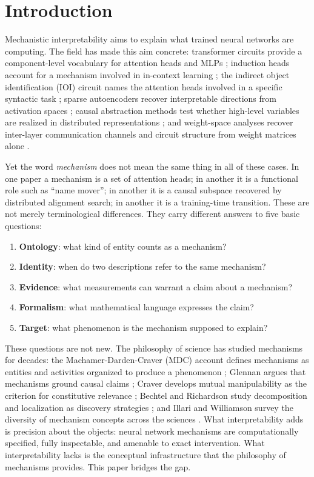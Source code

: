 \documentclass[11pt]{article}
\theoremstyle{remark}
\begin{document}
\section{Introduction}

Mechanistic interpretability aims to explain what trained neural
networks are computing.  The field has made this aim concrete:
transformer circuits provide a component-level vocabulary for attention
heads and MLPs \citep{elhage2021}; induction heads account for a
mechanism involved in in-context learning \citep{olsson2022}; the
indirect object identification (IOI) circuit names the attention heads
involved in a specific syntactic task \citep{wang2022}; sparse
autoencoders recover interpretable directions from activation spaces
\citep{bricken2023,templeton2024}; causal abstraction methods test
whether high-level variables are realized in distributed representations
\citep{geiger2021,geiger2024}; and weight-space analyses recover
inter-layer communication channels and circuit structure from weight
matrices alone \citep{merullo2024,elhage2021}.

Yet the word \emph{mechanism} does not mean the same thing in all of
these cases.  In one paper a mechanism is a set of attention heads;
in another it is a functional role such as ``name mover''; in another
it is a causal subspace recovered by distributed alignment search; in
another it is a training-time transition.  These are not merely
terminological differences.  They carry different answers to five basic
questions:
\begin{enumerate}[leftmargin=*,label=(\arabic*)]
\item \textbf{Ontology}: what kind of entity counts as a mechanism?
\item \textbf{Identity}: when do two descriptions refer to the same mechanism?
\item \textbf{Evidence}: what measurements can warrant a claim about a mechanism?
\item \textbf{Formalism}: what mathematical language expresses the claim?
\item \textbf{Target}: what phenomenon is the mechanism supposed to explain?
\end{enumerate}
These questions are not new.  The philosophy of science has studied
mechanisms for decades: the Machamer-Darden-Craver (MDC) account defines
mechanisms as entities and activities organized to produce a phenomenon
\citep{machamer2000}; Glennan argues that mechanisms ground causal claims
\citep{glennan1996}; Craver develops mutual manipulability as the
criterion for constitutive relevance \citep{craver2007}; Bechtel and
Richardson study decomposition and localization as discovery strategies
\citep{bechtel1993}; and Illari and Williamson survey the diversity of
mechanism concepts across the sciences \citep{illari2012}.  What
interpretability adds is precision about the objects: neural network
mechanisms are computationally specified, fully inspectable, and amenable
to exact intervention.  What interpretability lacks is the conceptual
infrastructure that the philosophy of mechanisms provides.  This paper
bridges the gap.
\end{document}
